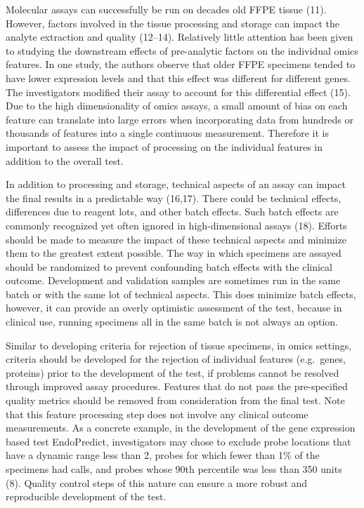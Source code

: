 \documentclass[11pt]{article}
\begin{document}
Molecular assays can successfully be run on decades old FFPE tissue
(11). However, factors involved in the tissue processing and storage can
impact the analyte extraction and quality (12--14). Relatively little
attention has been given to studying the downstream effects of
pre-analytic factors on the individual omics features. In one study, the
authors observe that older FFPE specimens tended to have lower
expression levels and that this effect was different for different
genes. The investigators modified their assay to account for this
differential effect (15). Due to the high dimensionality of omics
assays, a small amount of bias on each feature can translate into large
errors when incorporating data from hundreds or thousands of features
into a single continuous measurement. Therefore it is important to
assess the impact of processing on the individual features in addition
to the overall test.

In addition to processing and storage, technical aspects of an assay can
impact the final results in a predictable way (16,17). There could be
technical effects, differences due to reagent lots, and other batch
effects. Such batch effects are commonly recognized yet often ignored in
high-dimensional assays (18). Efforts should be made to measure the
impact of these technical aspects and minimize them to the greatest
extent possible. The way in which specimens are assayed should be
randomized to prevent confounding batch effects with the clinical
outcome. Development and validation samples are sometimes run in the
same batch or with the same lot of technical aspects. This does minimize
batch effects, however, it can provide an overly optimistic assessment
of the test, because in clinical use, running specimens all in the same
batch is not always an option.

Similar to developing criteria for rejection of tissue specimens, in
omics settings, criteria should be developed for the rejection of
individual features (e.g.~genes, proteins) prior to the development of
the test, if problems cannot be resolved through improved assay
procedures. Features that do not pass the pre-specified quality metrics
should be removed from consideration from the final test. Note that this
feature processing step does not involve any clinical outcome
measurements. As a concrete example, in the development of the gene
expression based test EndoPredict, investigators may chose to exclude
probe locations that have a dynamic range less than 2, probes for which
fewer than 1\% of the specimens had calls, and probes whose 90th
percentile was less than 350 units (8). Quality control steps of this
nature can ensure a more robust and reproducible development of the
test.
\end{document}
